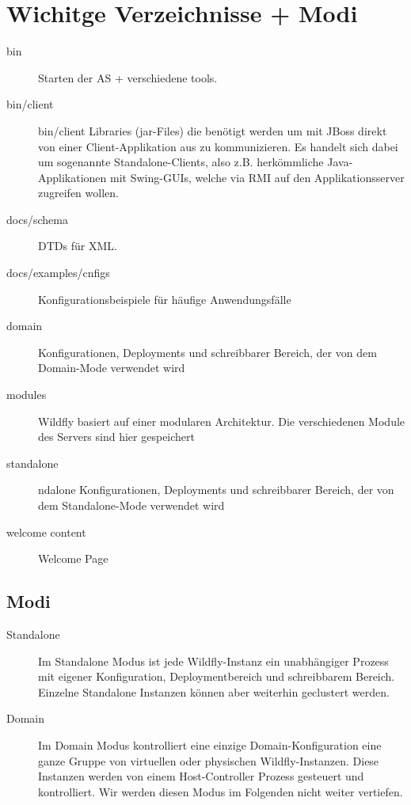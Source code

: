 \documentclass[a4paper,10pt]{scrreprt}
\begin{document}
\section{Wichitge Verzeichnisse + Modi} %
\label{sec:wichitge_verzeichnisse}
\begin{description}
	\item[bin] Starten der AS + verschiedene tools.
	\item[bin/client] bin/client
Libraries (jar-Files) die benötigt werden um mit JBoss direkt von einer Client-Applikation aus zu
kommunizieren. Es handelt sich dabei um sogenannte Standalone-Clients, also z.B. herkömmliche Java-
Applikationen mit Swing-GUIs, welche via RMI auf den Applikationsserver zugreifen wollen.
\item[docs/schema] DTDs für XML.
\item[docs/examples/cnfigs] Konfigurationsbeispiele für häufige Anwendungsfälle
\item[domain] Konfigurationen, Deployments und schreibbarer Bereich, der von dem Domain-Mode verwendet wird
\item[modules] Wildfly basiert auf einer modularen Architektur. Die verschiedenen Module des Servers sind hier gespeichert
\item[standalone] ndalone
Konfigurationen, Deployments und schreibbarer Bereich, der von dem Standalone-Mode verwendet wird
\item[welcome content] Welcome Page
\end{description}

\subsection{Modi} %
\label{sub:modi}
\begin{description}
	\item[Standalone]Im Standalone Modus ist jede Wildfly-Instanz ein unabhängiger Prozess mit eigener Konfiguration,
Deploymentbereich und schreibbarem Bereich. Einzelne Standalone Instanzen können aber weiterhin
geclustert werden.
\item[Domain]   Im Domain Modus kontrolliert eine einzige Domain-Konfiguration eine ganze Gruppe von virtuellen oder
physischen Wildfly-Instanzen. Diese Instanzen werden von einem Host-Controller Prozess gesteuert und
kontrolliert. Wir werden diesen Modus im Folgenden nicht weiter vertiefen.

\end{description}
\end{document}
